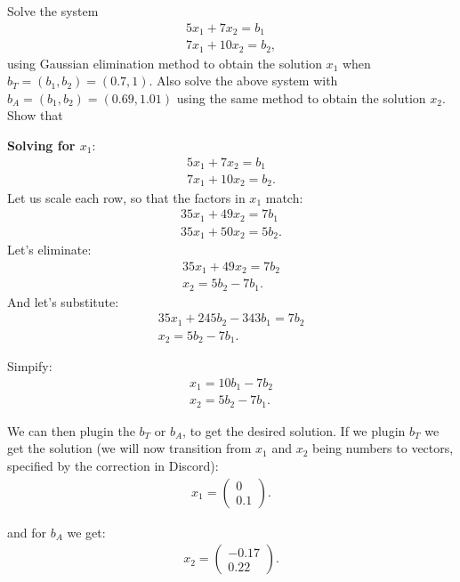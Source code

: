 \documentclass[10pt]{article}
\begin{document}
\begin{exercise}[4]  \label{exe:4}
Solve the system
\begin{align*}
5x_1 + 7x_2 = b_1 \\
7x_1 + 10x_2 = b_2
,
\end{align*}
using Gaussian elimination method to obtain the solution \(x_1\)
when \(b _{T} = (b_1, b_2) = (0.7, 1)\). Also solve the above system
with \(b_A = (b_1, b_2) = (0.69, 1.01)\) using the same method to
obtain the solution \(x_2\). Show that
\end{exercise}
\begin{solution}[4]  \label{sol:4}
\textbf{Solving for \(x_1\)}:
\begin{align*}
5x_1 + 7x_2 = b_1 \\
7x_1 + 10x_2 = b_2
.
\end{align*}
Let us scale each row, so that the factors in \(x_1\) match:
\begin{align*}
35x_1 + 49x_2 = 7b_1 \\
35x_1 + 50x_2 = 5b_2
.
\end{align*}
Let's eliminate:
\begin{align*}
35x_1 + 49x_2 = 7b_2 \\
 x_2 = 5b_2 - 7b_1
.
\end{align*}
And let's substitute:
\begin{align*}
35x_1 + 245 b_2 - 343 b_1 = 7 b_2 \\
x_2 = 5b_2 - 7b_1
.
\end{align*}

Simpify:
\begin{align*}
x_1 = 10 b_1 - 7 b_2 \\
x_2 = 5b_2 - 7b_1
.
\end{align*}

We can then plugin the \(b_T\) or \(b_A\), to get the desired solution.
If we plugin \(b_T\) we get the solution (we will now transition from \(x_1\) and
\(x_2\) being numbers to vectors, specified by the correction in Discord):
\begin{align*}
x_1 =
\left( \begin{array}{c}
0 \\
0.1
\end{array} \right)
.
\end{align*}

and for \(b_A\) we get:
\begin{align*}
x_2 =
\left( \begin{array}{}
-0.17 \\
0.22
\end{array} \right)
.
\end{align*}



\end{solution}
\end{document}

